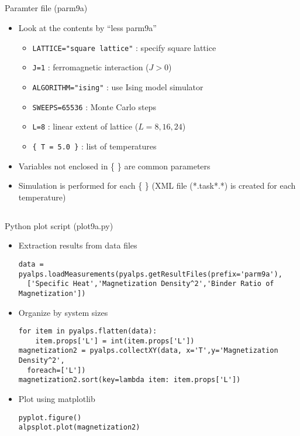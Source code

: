 \subsection*{\redb\whiteb\greenm}
\begin{frame}[t,fragile]{Paramter file (parm9a)}
  \begin{itemize}
    \setlength{\itemsep}{1em}
  \item Look at the contents by ``less parm9a''
    \begin{itemize}
    \item \verb+LATTICE="square lattice"+ : specify square lattice
    \item \verb+J=1+ : ferromagnetic interaction ($J>0$)
    \item \verb+ALGORITHM="ising"+ : use Ising model simulator
    \item \verb+SWEEPS=65536+ : Monte Carlo steps
    \item \verb+L=8+ : linear extent of lattice ($L=8, 16, 24$)
    \item \verb+{ T = 5.0 }+ : list of temperatures
    \end{itemize}
  \item Variables not enclosed in \{ \} are common parameters
  \item Simulation is performed for each \{ \} (XML file (*.task*.*) is created for each temperature)
  \end{itemize}
\end{frame}

\subsection*{\redb\whiteb\greenm}
\begin{frame}{Python plot script (plot9a.py)}
  \begin{itemize}
  \item Extraction results from data files
\begin{lstlisting}
data = pyalps.loadMeasurements(pyalps.getResultFiles(prefix='parm9a'),
  ['Specific Heat','Magnetization Density^2','Binder Ratio of Magnetization'])
\end{lstlisting}
  \item Organize by system sizes
\begin{lstlisting}
for item in pyalps.flatten(data):
    item.props['L'] = int(item.props['L'])
magnetization2 = pyalps.collectXY(data, x='T',y='Magnetization Density^2',
  foreach=['L'])
magnetization2.sort(key=lambda item: item.props['L'])
\end{lstlisting}
  \item Plot using matplotlib
\begin{lstlisting}
pyplot.figure()
alpsplot.plot(magnetization2)
\end{lstlisting}
  \end{itemize}
\end{frame}


